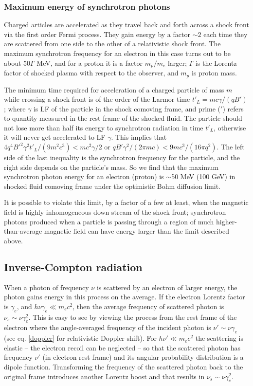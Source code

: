 \documentclass[12pt,a4paper]{article}
\begin{document}
\subsubsection{Maximum energy of synchrotron photons}
\label{synch_rad_max}

Charged articles are accelerated as they travel back and forth across a shock front via the first order Fermi process. They gain energy by a factor $\sim 2$ each time they are scattered from one side to the other of a relativistic shock front. The maximum synchrotron frequency for an electron in this case turns out to be about $50 \Gamma$ MeV, and for a proton it is a factor $m_p/m_e$ larger; $\Gamma$ is the Lorentz factor of shocked plasma with respect to the observer, and $m_p$ is proton mass.

The minimum time required for acceleration of a charged particle of mass $m$ while crossing a shock front is of the order of the Larmor time $t'_L = m c\gamma/(qB')$; where $\gamma$ is LF of the particle in the shock comoving frame, and prime ($'$) refers to quantity measured in the rest frame of the shocked fluid. The particle should not lose more than half its energy to synchrotron radiation in time $t'_L$, otherwise it will never get accelerated to LF $\gamma$. This implies that $4 q^4 B'^2\gamma^2 t'_L/(9 m^2 c^3) < m c^2 \gamma/2$ or $ qB'\gamma^2/(2\pi m c) < 9mc^3/(16\pi q^2)$. The left side of the last inequality is the synchrotron frequency for the particle, and the right side depends on the particle's mass. So we find that the maximum synchrotron photon energy for an electron (proton) is $\sim$50 MeV (100 GeV) in shocked fluid comoving frame under the optimistic Bohm diffusion limit.

It is possible to violate this limit, by a factor of a few at least, when the magnetic field is highly inhomogeneous down stream of the shock front; synchrotron photons produced when a particle is passing through a region of much higher-than-average magnetic field can have energy larger than the limit described above.

\subsection{Inverse-Compton radiation}

When a photon of frequency $\nu$ is scattered by an electron of larger 
energy, the photon gains energy in this process on the average.  
If the electron Lorentz factor is $\gamma_e$, and $h \nu \gamma_e \ll
m_e c^2$, then the average frequency of scattered photon is 
$\nu_s\sim \nu\gamma_e^2$. This is easy to see by viewing the process
from the rest frame of the electron where the angle-averaged 
frequency of the incident photon is $\nu'\sim \nu\gamma_e$ 
(see eq. \ref{doppler} for relativistic Doppler shift). For
$h\nu'\ll m_e c^2$ the scattering is elastic -- the electron
recoil can be neglected -- so that the scattered photon has frequency
$\nu'$ (in electron rest frame) and its angular probability 
distribution is a dipole function.  Transforming the frequency 
of the scattered photon back to the original frame introduces another 
Lorentz boost and that results in $\nu_s \sim \nu\gamma_e^2$.
\end{document}
